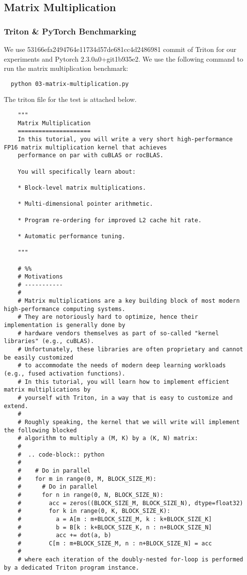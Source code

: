 \documentclass{article}
\begin{document}
\subsection{Matrix Multiplication}
\subsubsection{Triton \& PyTorch Benchmarking}
We use 53166efa2494764e11734d57de681cc4d2486981 commit of Triton for our experiments and Pytorch 2.3.0a0+git1b935e2. We use the following command to run the matrix multiplication benchmark:
\begin{lstlisting}
  python 03-matrix-multiplication.py
\end{lstlisting}
The triton file for the test is attached below.
\begin{lstlisting}
    """
    Matrix Multiplication
    =====================
    In this tutorial, you will write a very short high-performance FP16 matrix multiplication kernel that achieves
    performance on par with cuBLAS or rocBLAS.

    You will specifically learn about:

    * Block-level matrix multiplications.

    * Multi-dimensional pointer arithmetic.

    * Program re-ordering for improved L2 cache hit rate.

    * Automatic performance tuning.

    """

    # %%
    # Motivations
    # -----------
    #
    # Matrix multiplications are a key building block of most modern high-performance computing systems.
    # They are notoriously hard to optimize, hence their implementation is generally done by
    # hardware vendors themselves as part of so-called "kernel libraries" (e.g., cuBLAS).
    # Unfortunately, these libraries are often proprietary and cannot be easily customized
    # to accommodate the needs of modern deep learning workloads (e.g., fused activation functions).
    # In this tutorial, you will learn how to implement efficient matrix multiplications by
    # yourself with Triton, in a way that is easy to customize and extend.
    #
    # Roughly speaking, the kernel that we will write will implement the following blocked
    # algorithm to multiply a (M, K) by a (K, N) matrix:
    #
    #  .. code-block:: python
    #
    #    # Do in parallel
    #    for m in range(0, M, BLOCK_SIZE_M):
    #      # Do in parallel
    #      for n in range(0, N, BLOCK_SIZE_N):
    #        acc = zeros((BLOCK_SIZE_M, BLOCK_SIZE_N), dtype=float32)
    #        for k in range(0, K, BLOCK_SIZE_K):
    #          a = A[m : m+BLOCK_SIZE_M, k : k+BLOCK_SIZE_K]
    #          b = B[k : k+BLOCK_SIZE_K, n : n+BLOCK_SIZE_N]
    #          acc += dot(a, b)
    #        C[m : m+BLOCK_SIZE_M, n : n+BLOCK_SIZE_N] = acc
    #
    # where each iteration of the doubly-nested for-loop is performed by a dedicated Triton program instance.


\end{lstlisting}
\end{document}
